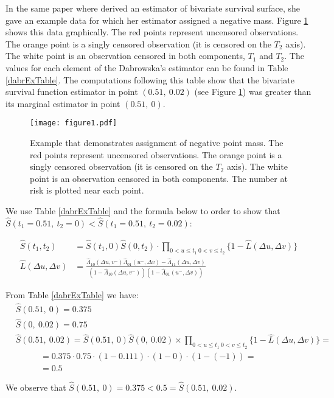 \documentclass[]{article}
\begin{document}
In the same paper where \cite{dabrowska1988kaplan} derived an estimator of bivariate survival surface, she gave an example data for which her estimator assigned a negative mass. Figure \ref{fig:bubbles} shows this data graphically. The red points represent uncensored observations. The orange point is a singly censored observation (it is censored on the $T_2$ axis). The white point is an observation censored in both components, $T_1$ and $T_2$. The values for each element of the Dabrowska's estimator can be found in Table \ref{dabrExTable}. The computations following this table show that the bivariate survival function estimator in point $(0.51,~0.02)$ (see Figure \ref{fig:bubbles}) was greater than its marginal estimator in point $(0.51,~0)$. 

\begin{figure}[!h]
\caption{Example that demonstrates assignment of negative point mass. The red points represent uncensored observations. The orange point is a singly censored observation (it is censored on the $T_2$ axis). The white point is an observation censored in both components. The number at risk is plotted near each point.}
\texttt{[image: figure1.pdf]}
\label{fig:bubbles}
\end{figure}

We use Table \ref{dabrExTable} and the formula below to order to show that $\hat{S}(t_1=0.51,~t_2=0) < \hat{S}(t_1=0.51,~t_2=0.02)$:

	$$
	\begin{aligned}
		\hat{S}(t_1,t_2) &= \hat{S}(t_1,0)\hat{S}(0,t_2)\cdot \prod_{{0<u\leq t_1~0<v\leq t_2}}\{1 - \hat{L}(\Delta u, \Delta v)\}\\
		\hat{L}(\Delta u, \Delta v) &= \frac{\hat{\Lambda}_{10}(\Delta u,v^-)\hat{\Lambda}_{01}(u^-,\Delta v) - \hat{\Lambda}_{11}(\Delta u, \Delta v)}{\left(1-\hat{\Lambda}_{10}(\Delta u,v^-)\right)\left(1-\hat{\Lambda}_{01}(u^-,\Delta v)\right)}
	\end{aligned}
	$$


From Table \ref{dabrExTable} we have:
	$$
	\begin{aligned}
		&\hat{S}(0.51,~0)  = 0.375\\
		&\hat{S}(0,~0.02)  = 0.75\\
		&\hat{S}(0.51,~0.02) = \hat{S}(0.51,~0)\hat{S}(0,~0.02) \times 
		\prod_{{0<u\leq t_1~0<v\leq t_2}}\{1 - \hat{L}(\Delta u, \Delta v)\}=\\
		&~~~~~~~~~~~~~= 0.375 \cdot 0.75 \cdot (1-0.111)\cdot (1-0)\cdot (1-(-1)) = \\
		&~~~~~~~~~~~~~= 0.5
	\end{aligned}
	$$

We observe that $\hat{S}(0.51,~0) = 0.375 < 0.5 = \hat{S}(0.51,~0.02)$.
\end{document}
